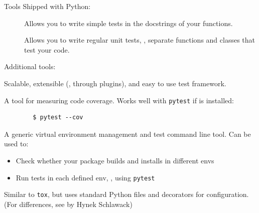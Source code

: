 {
\begin{frame}[fragile]{Tools}
  Shipped with Python:
  \begin{description}
    \item [] Allows you to write simple tests in the docstrings
      of your functions.
    \item [] Allows you to write regular unit tests,
      \ie, separate functions and classes that test your code.
  \end{description}
  \vspace{0.5cm}

  Additional tools:
  \begin{description}
    \item [\iref{https://docs.pytest.org/en/stable/}{pytest}] Scalable, extensible (\ie, through plugins), and easy to use test framework.
    \item [\iref{https://coverage.readthedocs.io/en/7.9.2/}{Coverage.py}] A tool for measuring code coverage. Works well with \texttt{pytest}
      if  is installed:
      \begin{verbatim}
        $ pytest --cov
      \end{verbatim}
    \item [\iref{https://tox.wiki/en/4.28.1/}{tox}] A generic virtual environment management and test command line tool. Can be used to:
      \begin{itemize}
        \item [\to] Check whether your package builds and installs in different envs
        \item [\to] Run tests in each defined env, \eg, using \texttt{pytest}
      \end{itemize}
    \item [\iref{https://nox.thea.codes/en/stable/}{Nox}] Similar to \texttt{tox}, but uses standard Python files and decorators for configuration.
      (For differences, see  by Hynek Schlawack)
  \end{description}
\end{frame}
}

